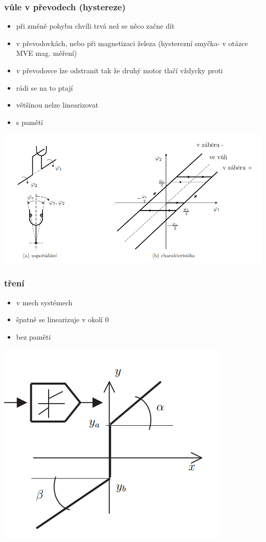 \subsubsection*{vůle v převodech (hystereze)}
\begin{itemize}
    \item při změně pohybu chvíli trvá než se něco začne dít
    \item v převodovkách, nebo při magnetizaci železa (hysterezní smyčka- v otázce MVE mag. měření)
    \item v převodovce lze odstranit tak že druhý motor tlačí vždycky proti
    \item rádi se na to ptají
    \item většinou nelze linearizovat
    \item s pamětí
\end{itemize}
\includegraphics{img/vule.png}

\subsubsection*{tření}
\begin{itemize}
    \item v mech systémech
    \item špatně se linearizuje v okolí 0
    \item bez paměti
\end{itemize}
\includegraphics{img/treni.png}

